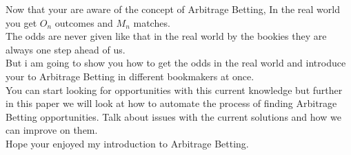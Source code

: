 Now that your are aware of the concept of Arbitrage Betting, In the real world you get $O_{n}$ outcomes and $M_{n}$ matches. \\ The odds are never given like that in the real world by the bookies they are always one step ahead of us. \\ But i am going to show you how to get the odds in the real world and introduce your to Arbitrage Betting in different bookmakers at once. \\
You can start looking for opportunities with this current knowledge but further in this paper we will look at how to automate the process of finding Arbitrage Betting opportunities. Talk about issues with the current solutions and how we can improve on them. \\ 
Hope your enjoyed my introduction to Arbitrage Betting. \\

















 



    







